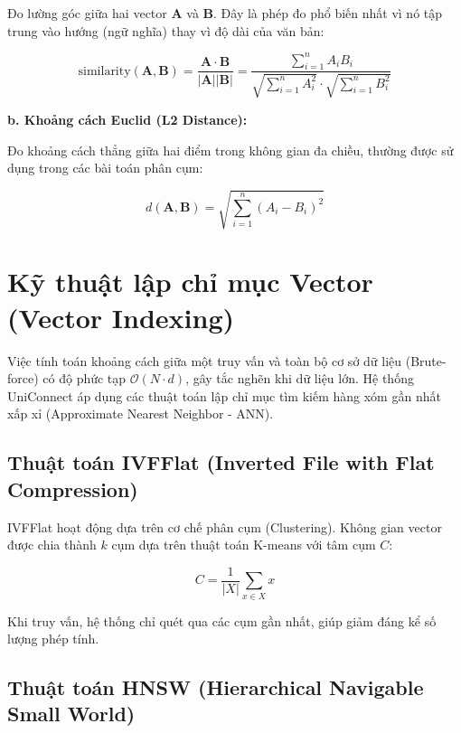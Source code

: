 Đo lường góc giữa hai vector $\mathbf{A}$ và $\mathbf{B}$. Đây là phép đo phổ biến nhất vì nó tập trung vào hướng (ngữ nghĩa) thay vì độ dài của văn bản:

\begin{equation}\text{similarity}(\mathbf{A}, \mathbf{B}) = \frac{\mathbf{A} \cdot \mathbf{B}}{|\mathbf{A}| |\mathbf{B}|} = \frac{\sum_{i=1}^{n} A_i B_i}{\sqrt{\sum_{i=1}^{n} A_i^2} \cdot \sqrt{\sum_{i=1}^{n} B_i^2}}\end{equation}

\textbf{b. Khoảng cách Euclid (L2 Distance):}

Đo khoảng cách thẳng giữa hai điểm trong không gian đa chiều, thường được sử dụng trong các bài toán phân cụm:

\begin{equation}d(\mathbf{A}, \mathbf{B}) = \sqrt{\sum_{i=1}^{n} (A_i - B_i)^2}\end{equation}

\section{Kỹ thuật lập chỉ mục Vector (Vector Indexing)}

Việc tính toán khoảng cách giữa một truy vấn và toàn bộ cơ sở dữ liệu (Brute-force) có độ phức tạp $\mathcal{O}(N \cdot d)$, gây tắc nghẽn khi dữ liệu lớn. Hệ thống UniConnect áp dụng các thuật toán lập chỉ mục tìm kiếm hàng xóm gần nhất xấp xỉ (Approximate Nearest Neighbor - ANN)\cite{johnson2021billion, douze2024faiss}.

\subsection{Thuật toán IVFFlat (Inverted File with Flat Compression)}

IVFFlat hoạt động dựa trên cơ chế phân cụm (Clustering). Không gian vector được chia thành $k$ cụm dựa trên thuật toán K-means với tâm cụm $C$:

\begin{equation}C = \frac{1}{|X|} \sum_{x \in X} x\end{equation}

Khi truy vấn, hệ thống chỉ quét qua các cụm gần nhất, giúp giảm đáng kể số lượng phép tính\cite{sivic2003video}.

\subsection{Thuật toán HNSW (Hierarchical Navigable Small World)}

